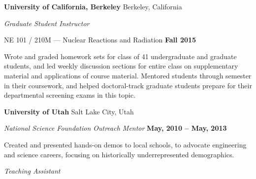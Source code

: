 
{\bf University of California, Berkeley} \hfill{ Berkeley, California}

\vspace*{-.05in}
{\em Graduate Student Instructor} 

\begin{list2}
\item NE 101 / 210M --- Nuclear Reactions and Radiation  \hfill {\bf Fall 2015}

\begin{list1}
\item[] Wrote and graded homework sets  for class of 41
undergraduate and graduate students, and led weekly discussion sections for entire class on supplementary material and applications of course material.
Mentored students through semester in their coursework, and helped doctoral-track graduate students prepare for their departmental screening exams in this topic.

\vspace*{.05in}  

\end{list1}
\end{list2}

{\bf University of Utah} \hfill{ Salt Lake City, Utah}

\vspace*{-.05in}
{\em National Science Foundation Outreach Mentor} \hfill {\bf May, 2010 -- May, 2013}

\begin{list2}
\item Created and presented hands-on demos to local schools, to advocate engineering and science careers, focusing on historically underrepresented demographics.
\end{list2}
\vspace*{-.05in}
{\em Teaching Assistant} 

